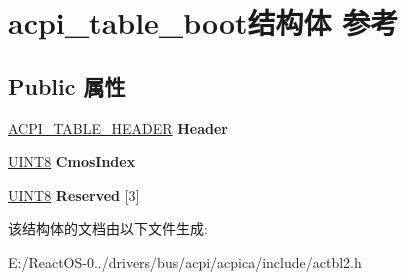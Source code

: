 \hypertarget{structacpi__table__boot}{}\section{acpi\+\_\+table\+\_\+boot结构体 参考}
\label{structacpi__table__boot}
\subsection*{Public 属性}
\begin{DoxyCompactItemize}
\item 
\mbox{\label{structacpi__table__boot_a997220d6aa228d975f8ff6523b4d6c64}} 
\hyperlink{structacpi__table__header}{A\+C\+P\+I\+\_\+\+T\+A\+B\+L\+E\+\_\+\+H\+E\+A\+D\+ER} {\bfseries Header}
\item 
\mbox{\label{structacpi__table__boot_ad2179de5402eb1b35f3743964d7965ed}} 
\hyperlink{_processor_bind_8h_ab27e9918b538ce9d8ca692479b375b6a}{U\+I\+N\+T8} {\bfseries Cmos\+Index}
\item 
\mbox{\label{structacpi__table__boot_a2d1bd498a3e8684584df689d5a50c097}} 
\hyperlink{_processor_bind_8h_ab27e9918b538ce9d8ca692479b375b6a}{U\+I\+N\+T8} {\bfseries Reserved} \mbox{[}3\mbox{]}
\end{DoxyCompactItemize}


该结构体的文档由以下文件生成\+:\begin{DoxyCompactItemize}
\item 
E\+:/\+React\+O\+S-\/0../drivers/bus/acpi/acpica/include/actbl2.\+h\end{DoxyCompactItemize}
